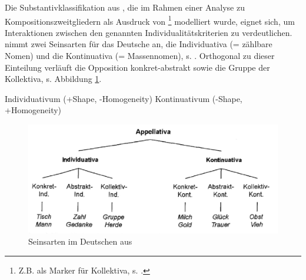 Die Substantivklassifikation aus \textcite[104]{Zifonun2012}, die im Rahmen einer Analyse zu Kompositionszweitgliedern als Ausdruck von \footnote{Z.B. als Marker für Kollektiva, s. \textcite[101]{Zifonun2012}.} modelliert wurde, eignet sich, um  Interaktionen zwischen den genannten Individualitätskriterien zu verdeutlichen. \textcite[103]{Zifonun2012} nimmt zwei Seinsarten für das Deutsche an, die Individuativa (= zählbare Nomen) und die Kontinuativa (= Massennomen), s.  \parencite[basierend auf][]{Rijkhoff1991,Rijkhoff2002}. Orthogonal zu dieser Einteilung verläuft die Opposition konkret-abstrakt sowie die Gruppe der Kollektiva, s. Abbildung \ref{abb:zifonun-seinsarten}.

\begin{exe}
	\ex \label{ex:seinsarten}
	\begin{xlist}
		\ex \label{ex:indi} Individuativum (+Shape, -Homogeneity)
		\ex \label{ex:konti} Kontinuativum (-Shape, +Homogeneity)
 	\end{xlist}
\end{exe}

\begin{figure}
\begin{center}
\includegraphics[width=12cm]{images/zifonun-seinarten-neu.jpg}
\caption {Seinsarten im Deutschen aus \textcite[104]{Zifonun2012}\label{abb:zifonun-seinsarten}}
\end{center}
\end{figure}

